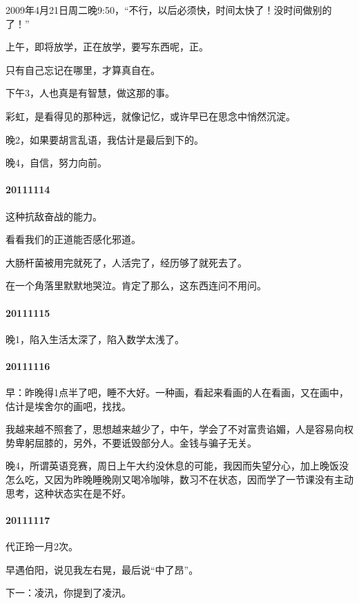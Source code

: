 \documentclass[UTF8]{book}
\begin{document}
2009年4月21日周二晚9:50，“不行，以后必须快，时间太快了！没时间做别的了！”

上午，即将放学，正在放学，要写东西呢，正。

只有自己忘记在哪里，才算真自在。

下午3，人也真是有智慧，做这那的事。

彩虹，是看得见的那种远，就像记忆，或许早已在思念中悄然沉淀。

晚2，如果要胡言乱语，我估计是最后到下的。

晚4，自信，努力向前。


\paragraph{20111114}

这种抗敌奋战的能力。

看看我们的正道能否感化邪道。

大肠杆菌被用完就死了，人活完了，经历够了就死去了。

在一个角落里默默地哭泣。肯定了那么，这东西连问不用问。


\paragraph{20111115}

晚1，陷入生活太深了，陷入数学太浅了。


\paragraph{20111116}

早：昨晚得1点半了吧，睡不大好。一种画，看起来看画的人在看画，又在画中，估计是埃舍尔的画吧，找找。

我越来越不照套了，思想越来越少了，中午，学会了不对富贵谄媚，人是容易向权势卑躬屈膝的，另外，不要诋毁部分人。金钱与骗子无关。

晚4，所谓英语竞赛，周日上午大约没休息的可能，我因而失望分心，加上晚饭没怎么吃，又因为昨晚睡晚刚又喝冷咖啡，数习不在状态，因而学了一节课没有主动思考，这种状态实在是不好。


\paragraph{20111117}

代正玲一月2次。

早遇伯阳，说见我左右晃，最后说“中了昂”。

下一：凌汛，你提到了凌汛。
\end{document}
